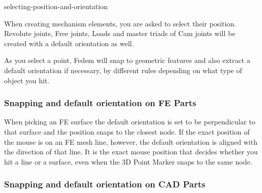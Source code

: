            {selecting-position-and-orientation}

When creating mechanism elements, you are asked to select their position.
Revolute joints, Free joints, Loads and master triads of Cam joints
will be created with a default orientation as well.

As you select a point, Fedem will snap to geometric features and also extract a
default orientation if necessary, by different rules depending on what type of
object you hit.

\subsubsection{Snapping and default orientation on FE Parts}

When picking an FE surface the default orientation is set to be perpendicular to
that surface and the position snaps to the closest node.
If the exact position of the mouse is on an FE mesh line, however,
the default orientation is aligned with the direction of that line.
It is the exact mouse position that decides whether you hit a line or a surface,
even when the 3D Point Marker snaps to the same node.

\subsubsection{Snapping and default orientation on CAD Parts}


